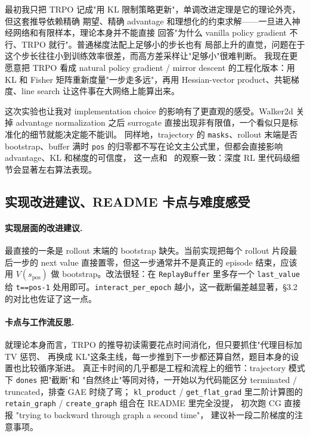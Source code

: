 \documentclass[12pt]{article}
\begin{document}
最初我只把 TRPO 记成"用 KL 限制策略更新"，单调改进定理是它的理论外壳，但这套推导依赖精确
期望、精确 advantage 和理想化的约束求解——一旦进入神经网络和有限样本，理论本身并不能直接
回答"为什么 vanilla policy gradient 不行、TRPO 就行"。普通梯度法配上足够小的步长也有
局部上升的直觉，问题在于这个步长往往小到训练效率很差，而高方差采样让"足够小"很难判断。
我现在更愿意把 TRPO 看成 natural policy gradient / mirror descent 的工程化版本：用 KL
和 Fisher 矩阵重新度量"一步走多远"，再用 Hessian-vector product、共轭梯度、line search
让这件事在大网络上能算出来。

这次实验也让我对 implementation choice 的影响有了更直观的感受。Walker2d 关掉 advantage
normalization 之后 surrogate 直接出现非有限值，一个看似只是标准化的细节就能决定能不能训。
同样地，trajectory 的 \texttt{masks}、rollout 末端是否 bootstrap、buffer 满时
\texttt{pos} 的归零都不写在论文主公式里，但都会直接影响 advantage、KL 和梯度的可信度，
这一点和~\cite{implmatters} 的观察一致：深度 RL 里代码级细节会显著左右算法表现。

\subsection{实现改进建议、README 卡点与难度感受}

\paragraph{实现层面的改进建议.}
最直接的一条是 rollout 末端的 bootstrap 缺失。当前实现把每个 rollout 片段最后一步的
next value 直接置零，但这一步通常并不是真正的 episode 结束，应该用
$V(s_{\text{pos}})$ 做 bootstrap。改法很轻：在 \texttt{ReplayBuffer} 里多存一个
\texttt{last\_value} 给 \texttt{t==pos-1} 处用即可。\texttt{interact\_per\_epoch}
越小，这一截断偏差越显著，§3.2 的对比也佐证了这一点。

\paragraph{卡点与工作流反思.}
就理论本身而言，TRPO 的推导初读需要花点时间消化，但只要抓住"代理目标加 TV 惩罚、
再换成 KL"这条主线，每一步推到下一步都还算自然，题目本身的设置也比较循序渐进。
真正卡时间的几乎都是工程和流程上的细节：trajectory 模式下 \texttt{dones} 把"截断"和
"自然终止"等同对待，一开始以为代码能区分 terminated / truncated，排查 GAE 时绕了弯；
\texttt{kl\_product} / \texttt{get\_flat\_grad} 里二阶计算图的
\texttt{retain\_graph} / \texttt{create\_graph} 组合在 README 里完全没提，
初次跑 CG 直接报 "trying to backward through graph a second time"，
建议补一段二阶梯度的注意事项。
\end{document}
